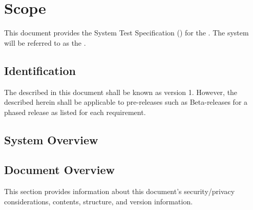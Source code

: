 
\chapter{Scope}
\label{loc:Scope}


This document provides the System Test Specification (\STS) for the \ThisSystem. 
The system will be referred to as the \ThisSys.

\section{Identification}
\label{loc:Identification}


The \ThisSystem described in this document shall be known as \ThisSys version 1.
However, the \STS described herein shall be applicable to pre-releases such as Beta-releases for a phased release as listed for each requirement.

\section{System Overview}
\label{loc:SystemOverview}





\section{Document Overview}
\label{loc:DocumentOverview}


This section provides information about this document's security/privacy considerations, contents, structure, and version information.







